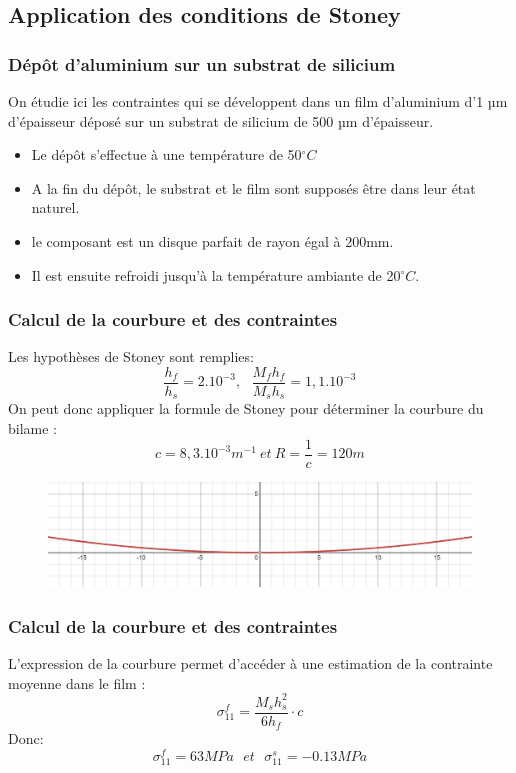 \subsection{Application des conditions de Stoney}

\begin{frame}
    \frametitle{Dépôt d'aluminium sur un substrat de silicium}
    On étudie ici
les contraintes qui se développent dans un film d’aluminium d’1 µm d’épaisseur déposé sur un substrat
de silicium de 500 µm d’épaisseur.
    \begin{itemize}
        \item Le dépôt s’effectue à une température de 50$^{\circ}C$
        \item A la fin du dépôt, le substrat et le film sont supposés être dans leur état naturel.
        \item le composant est un disque parfait de rayon égal à 200mm.
        \item Il est ensuite refroidi jusqu’à la température ambiante de 20$^{\circ}C$.
    \end{itemize}
\end{frame}

\begin{frame}
    \frametitle{Calcul de la courbure et des contraintes}
    Les hypothèses de Stoney sont remplies:
    $$\frac{h_{f}}{h_{s}} = 2.10^{-3},   ~ ~ ~ \frac{M_{f}h_{f}}{M_{s}h_{s}} = 1,1.10^{-3}$$
    On peut donc appliquer la formule de Stoney pour déterminer la courbure du bilame :
    $$c = 8,3.10^{-3} m^{-1} ~ et ~ R = \frac{1}{c}=120m$$
    \begin{figure}
        \centering
        \includegraphics[scale=0.4]{imgs/courbure positive.JPG}
    \end{figure}
\end{frame}

\begin{frame}
    \frametitle{Calcul de la courbure et des contraintes}
    L'expression de la courbure permet d'accéder à une estimation de la contrainte moyenne dans le film : 
    $$ \sigma_{11}^{f} = \frac{M_sh_s^2}{6h_f}\cdot c $$
    Donc:
    $$ \sigma_{11}^{f} = 63 MPa ~~~ et ~~~ \sigma_{11}^{s} = -0.13 MPa $$ 
\end{frame}

